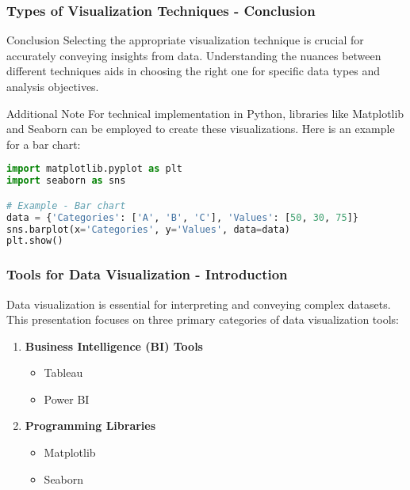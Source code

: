 \documentclass[aspectratio=169]{beamer}
\begin{document}
\begin{frame}[fragile]
  \frametitle{Types of Visualization Techniques - Conclusion}
  \begin{block}{Conclusion}
    Selecting the appropriate visualization technique is crucial for accurately conveying insights from data. 
    Understanding the nuances between different techniques aids in choosing the right one for specific data types and analysis objectives.
  \end{block}

  \begin{block}{Additional Note}
    For technical implementation in Python, libraries like Matplotlib and Seaborn can be employed to create these visualizations. 
    Here is an example for a bar chart:
    \begin{lstlisting}[language=Python]
import matplotlib.pyplot as plt
import seaborn as sns

# Example - Bar chart
data = {'Categories': ['A', 'B', 'C'], 'Values': [50, 30, 75]}
sns.barplot(x='Categories', y='Values', data=data)
plt.show()
    \end{lstlisting}
  \end{block}
\end{frame}

\begin{frame}[fragile]
    \frametitle{Tools for Data Visualization - Introduction}
    Data visualization is essential for interpreting and conveying complex datasets. 
    This presentation focuses on three primary categories of data visualization tools:
    \begin{enumerate}
        \item \textbf{Business Intelligence (BI) Tools}
            \begin{itemize}
                \item Tableau
                \item Power BI
            \end{itemize}
        \item \textbf{Programming Libraries}
            \begin{itemize}
                \item Matplotlib
                \item Seaborn
            \end{itemize}
    \end{enumerate}
\end{frame}
\end{document}
